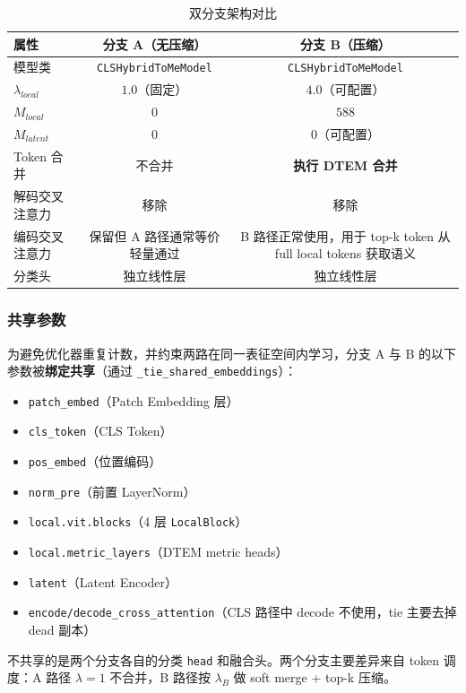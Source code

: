\documentclass[a4paper,11pt]{article}
\begin{document}
\begin{table}[h]
\centering
\caption{双分支架构对比}
\begin{tabular}{l c c}
\toprule
\textbf{属性} & \textbf{分支 A（无压缩）} & \textbf{分支 B（压缩）} \\
\midrule
模型类 & \texttt{CLSHybridToMeModel} & \texttt{CLSHybridToMeModel} \\
$\lambda_{local}$ & $1.0$（固定） & $4.0$（可配置） \\
$M_{local}$ & $0$ & $588$ \\
$M_{latent}$ & $0$ & $0$（可配置） \\
Token 合并 & 不合并 & \textbf{执行 DTEM 合并} \\
解码交叉注意力 & 移除 & 移除 \\
编码交叉注意力 & 保留但 A 路径通常等价轻量通过 & B 路径正常使用，用于 top-k token 从 full local tokens 获取语义 \\
分类头 & 独立线性层 & 独立线性层 \\
\bottomrule
\end{tabular}
\end{table}

\subsubsection{共享参数}

为避免优化器重复计数，并约束两路在同一表征空间内学习，分支 A 与 B 的以下参数被\textbf{绑定共享}（通过 \texttt{\_tie\_shared\_embeddings}）：
\begin{itemize}
    \item \texttt{patch\_embed}（Patch Embedding 层）
    \item \texttt{cls\_token}（CLS Token）
    \item \texttt{pos\_embed}（位置编码）
    \item \texttt{norm\_pre}（前置 LayerNorm）
    \item \texttt{local.vit.blocks}（4 层 \texttt{LocalBlock}）
    \item \texttt{local.metric\_layers}（DTEM metric heads）
    \item \texttt{latent}（Latent Encoder）
    \item \texttt{encode/decode\_cross\_attention}（CLS 路径中 decode 不使用，tie 主要去掉 dead 副本）
\end{itemize}

不共享的是两个分支各自的分类 \texttt{head} 和融合头。两个分支主要差异来自 token 调度：A 路径 $\lambda=1$ 不合并，B 路径按 $\lambda_B$ 做 soft merge + top-k 压缩。
\end{document}
